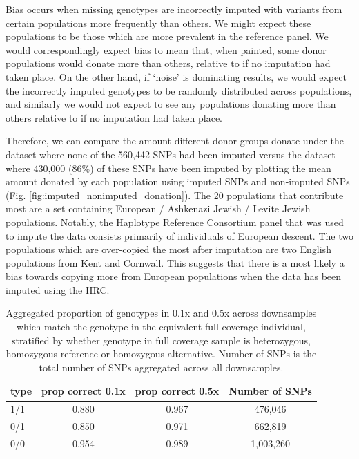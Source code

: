 {Bias occurs when missing genotypes are incorrectly imputed with variants from certain populations more frequently than others. We might expect these populations to be those which are more prevalent in the reference panel. We would correspondingly expect bias to mean that, when painted, some donor populations would donate more than others, relative to if no imputation had taken place. On the other hand, if `noise' is dominating results, we would expect the incorrectly imputed genotypes to be randomly distributed across populations, and similarly we would not expect to see any populations donating more than others relative to if no imputation had taken place. 

Therefore, we can compare the amount different donor groups donate under the dataset where none of the 560,442 SNPs had been imputed versus the dataset where 430,000 (86\%) of these SNPs have been imputed by plotting the mean amount donated by each population using imputed SNPs and non-imputed SNPs (Fig. \ref{fig:imputed_nonimputed_donation}). The 20 populations that contribute most are a set containing European / Ashkenazi Jewish / Levite Jewish populations. Notably, the Haplotype Reference Consortium panel that was used to impute the data consists primarily of individuals of European descent. The two populations which are over-copied the most after imputation are two English populations from Kent and Cornwall. This suggests that there is a most likely a bias towards copying more from European populations when the data has been imputed using the HRC. 

\begin{table}
\centering\begingroup\fontsize{10}{10}\selectfont

\begin{tabular}[t]{lccc}
\toprule
type & prop correct 0.1x & prop correct 0.5x & Number of SNPs\\
\midrule
1/1 & 0.880 & 0.967 & 476,046\\
0/1 & 0.850 & 0.971 & 662,819\\
0/0 & 0.954 & 0.989 & 1,003,260\\
\bottomrule
\end{tabular}
\caption{Aggregated proportion of genotypes in 0.1x and 0.5x across downsamples which match the genotype in the equivalent full coverage individual, stratified by whether genotype in full coverage sample is heterozygous, homozygous reference or homozygous alternative. Number of SNPs is the total number of SNPs aggregated across all downsamples.}
\endgroup{}
\label{tab:genotype_class_prop}
\end{table}

}
